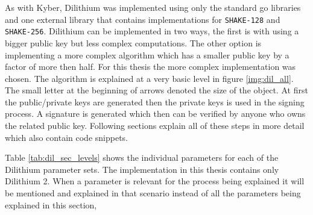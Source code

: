 As with Kyber, Dilithium was implemented using only the standard go libraries and one external library \cite{00fV2cvg7Z6H2tS3} that contains implementations for \texttt{SHAKE-128} and \texttt{SHAKE-256}. Dilithium can be implemented in two ways, the first is with using a bigger public key but less complex computations. The other option is implementing a more complex algorithm which has a smaller public key by a factor of more then half. For this thesis the more complex implementation was chosen. The algorithm is explained at a very basic level in figure \ref{img:dil_all}. The small letter at the beginning of arrows denoted the size of the object. At first the public/private keys are generated then the private keys is used in the signing process. A signature is generated which then can be verified by anyone who owns the related public key. Following sections explain all of these steps in more detail which also contain code snippets.

Table \ref{tab:dil_sec_levels} shows the individual parameters for each of the Dilithium parameter sets. The implementation in this thesis contains only Dilithium 2. When a parameter is relevant for the process being explained it will be mentioned and explained in that scenario instead of all the parameters being explained in this section,

